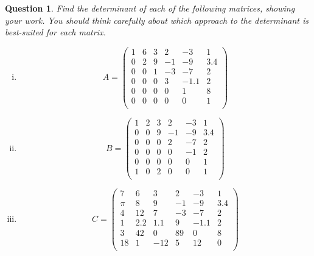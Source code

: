 \documentclass[12pt]{article}
\newtheorem{question}[thm]{Question}
\begin{document}
\vspace{1cm}
\begin{question}
\normalfont
\noindent Find the determinant of each of the following matrices, showing your work. You should think carefully about which approach to the determinant is best-suited for each matrix. 

\begin{enumerate}[(i)]

\item \[A= \left( \begin{array}{cccccc}
1 & 6 & 3 & 2  & -3 & 1\\
0 & 2 & 9 & - 1 & - 9 & 3.4\\
0 & 0 & 1 & -3 & -7& 2\\
0 & 0 & 0 & 3 & -1.1 & 2\\
0 & 0 & 0 & 0 & 1& 8\\
0 & 0 & 0 & 0 & 0& 1\\
\end{array} \right)\]



\item \[B= \left( \begin{array}{cccccc}
1 & 2 & 3 & 2  & -3 & 1\\
0 & 0 & 9 & - 1 & - 9 & 3.4\\
0 & 0 & 0 & 2 & -7& 2\\
0 & 0 & 0 & 0 & -1 & 2\\
0 & 0 & 0 & 0 & 0 & 1\\
1 & 0 & 2 & 0 & 0& 1\\
\end{array} \right)\]




\item \[
C= \left( \begin{array}{cccccc}
7 & 6 & 3 & 2  & -3 & 1\\
\pi & 8 & 9 & - 1 & - 9 & 3.4\\
4 & 12 & 7 & -3 & -7& 2\\
1 & 2.2 & 1.1 & 9 & -1.1 & 2\\
3 & 42 & 0 & 89 & 0& 8\\
18 & 1 & -12 & 5 & 12& 0\\
\end{array} \right)\]
\end{enumerate}

\end{question}
\vspace{1cm}
\end{document}
